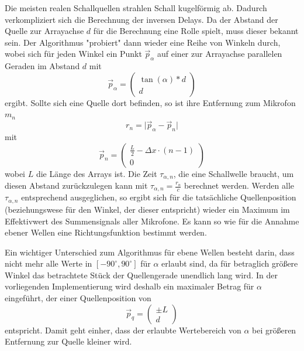 	Die meisten realen Schallquellen strahlen Schall kugelförmig ab. Dadurch verkompliziert sich die Berechnung der inversen Delays. Da der Abstand der Quelle zur Arrayachse $d$ für die Berechnung eine Rolle spielt, muss dieser bekannt sein. Der Algorithmus "probiert" dann wieder eine Reihe von Winkeln durch, wobei sich für jeden Winkel ein Punkt $\vec{p}_{\alpha}$ auf einer zur Arrayachse parallelen Geraden im Abstand $d$ mit
	\begin{equation}\vec{p}_{\alpha} = 
		\begin{pmatrix}
			\tan(\alpha) * d \\
			d
		\end{pmatrix}
	\end{equation}
	ergibt. Sollte sich eine Quelle dort befinden, so ist ihre Entfernung zum Mikrofon $m_n$
	\begin{equation}
		r_n = \lvert \vec{p}_{\alpha} - \vec{p}_{n} \rvert
	\end{equation}
	mit
	\begin{equation}
		\vec{p}_n =
		\begin{pmatrix}
			\frac{L}{2} - \Delta x \cdot (n - 1) \\
			0
		\end{pmatrix}
	\end{equation}
	wobei $L$ die Länge des Arrays ist. Die Zeit $\tau_{\alpha, n}$, die eine Schallwelle braucht, um diesen Abstand zurückzulegen kann mit $\tau_{\alpha, n} = \frac{r_n}{c}$ berechnet werden. Werden alle $\tau_{\alpha, n}$ entsprechend ausgeglichen, so ergibt sich für die tatsächliche Quellenposition (beziehungswese für den Winkel, der dieser entspricht) wieder ein Maximum im Effektivwert des Summensignals aller Mikrofone. Es kann so wie für die Annahme ebener Wellen eine Richtungsfunktion bestimmt werden.
	
	Ein wichtiger Unterschied zum Algorithmus für ebene Wellen besteht darin, dass nicht mehr alle Werte in $[-90^{\circ}, 90^{\circ}]$ für $\alpha$ erlaubt sind, da für betraglich größere Winkel das betrachtete Stück der Quellengerade unendlich lang wird. In der vorliegenden Implementierung wird deshalb ein maximaler Betrag für $\alpha$ eingeführt, der einer Quellenposition von 
	\begin{equation}
		\vec{p}_q = 
	\begin{pmatrix}
		\pm L \\
		d
	\end{pmatrix}
	\end{equation}
	entspricht. Damit geht einher, dass der erlaubte Wertebereich von $\alpha$ bei größeren Entfernung zur Quelle kleiner wird.
	

